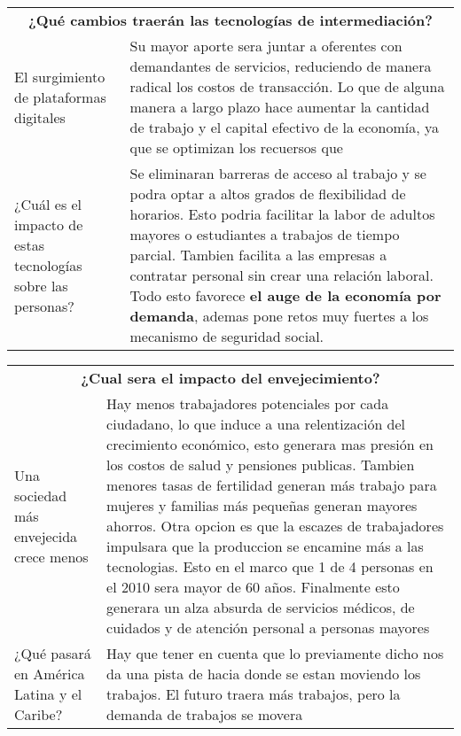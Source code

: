 \begingroup
\setlength{\tabcolsep}{12pt} %
\renewcommand{\arraystretch}{1.5} %
\begin{tabular}{p{4cm}|p{11cm}}
\multicolumn{2}{c}{\large \bf ¿Qué cambios traerán las tecnologías de intermediación?}\\
El surgimiento de plataformas digitales& Su mayor aporte sera juntar a oferentes con demandantes de servicios, reduciendo de manera radical los costos de transacción. Lo que de alguna manera a largo plazo hace aumentar la cantidad de trabajo y el capital efectivo de la economía, ya que se optimizan los recuersos que\\
¿Cuál es el impacto de estas tecnologías sobre las personas?&Se eliminaran barreras de acceso al trabajo y se podra optar a altos grados de flexibilidad de horarios. Esto podria facilitar la labor de adultos mayores o estudiantes a trabajos de tiempo parcial. Tambien facilita a las empresas a contratar personal sin crear una relación laboral. Todo esto favorece {\bf el auge de la economía por demanda}, ademas pone retos muy fuertes a los mecanismo de seguridad social.\\
\end{tabular}
\endgroup

\begingroup
\setlength{\tabcolsep}{12pt} %
\renewcommand{\arraystretch}{1.5} %
\begin{tabular}{p{4cm}|p{11cm}}
\multicolumn{2}{c}{\large \bf ¿Cual sera el impacto del envejecimiento?}\\
Una sociedad más envejecida crece menos&Hay menos trabajadores potenciales por cada ciudadano, lo que induce a una relentización del crecimiento económico, esto generara mas presión en los costos de salud y pensiones publicas. Tambien menores tasas de fertilidad generan más trabajo para mujeres y familias más pequeñas generan mayores ahorros. Otra opcion es que la escazes de trabajadores impulsara que la produccion se encamine más a las tecnologias. Esto en el marco que 1 de 4 personas en el 2010 sera mayor de 60 años. Finalmente esto generara un alza absurda de servicios médicos, de cuidados y de atención personal a personas mayores\\
¿Qué pasará en América Latina y el Caribe?& Hay que tener en cuenta que lo previamente dicho nos da una pista de hacia donde se estan moviendo los trabajos. El futuro traera más trabajos, pero la demanda de trabajos se movera\\

\end{tabular}
\endgroup





